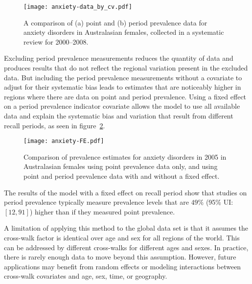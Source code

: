     \begin{figure}[h]
        \begin{center}
            \texttt{[image: anxiety-data\_by\_cv.pdf]}
            \caption[Systematic review data of anxiety disorders.]{A comparison of (a) point and (b) period prevalence data
              for anxiety disorders in Australasian females, collected in a systematic review for
              2000--2008.}
            \label{fig:app-anxiety data}
        \end{center}
    \end{figure}

Excluding period prevalence measurements reduces the quantity of data
and produces results that do not reflect the regional variation
present in the excluded data.  But including the period prevalence
measurements without a covariate to adjust for their systematic bias
leads to estimates that are noticeably higher in regions where there
are data on point and period prevalence.  Using a fixed effect on a
period prevalence indicator covariate allows the model to use all
available data and explain the systematic bias and variation that
result from different recall periods, as seen in
figure~\ref{fig:app-anxiety FE}.

    \begin{figure}[h]
        \begin{center}
            \texttt{[image: anxiety-FE.pdf]}
            \caption[Comparison of prevalence estimates of anxiety disorders 
              using different methods.]{Comparison of prevalence estimates for anxiety
              disorders in 2005 in Australasian females using point
              prevalence data only, and using point and period prevalence data
              with and without a fixed effect.}
            \label{fig:app-anxiety FE}
        \end{center}
    \end{figure}

The results of the model with a fixed effect on recall period show
that studies on period prevalence typically measure prevalence levels
that are $49$\% (95\% UI: $[12, 91]$) higher than if they measured point
prevalence.

A limitation of applying this method to the global data set is that it
assumes the cross-walk factor is identical over age and sex for all regions of the
world.  This can be addressed by different cross-walks for different ages
and sexes.  In practice, there is rarely enough data to move beyond this
assumption.  However, future applications may benefit from random effects or modeling
interactions between cross-walk covariates and age, sex, time, or
geography.
